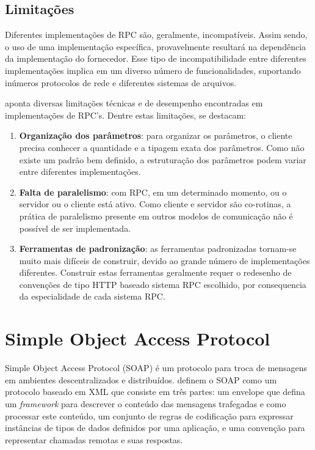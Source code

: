 \subsection{Limitações}

Diferentes implementações de RPC são, geralmente, incompatíveis. Assim sendo, o uso de uma implementação específica, provavelmente resultará na dependência da implementação do fornecedor. Esse tipo de incompatibilidade entre diferentes implementações implica em um diverso número de funcionalidades, suportando inúmeros protocolos de rede e diferentes sistemas de arquivos.

 aponta diversas limitações técnicas e de desempenho encontradas em implementações de RPC's. Dentre estas limitações, se destacam:

\begin{enumerate}[label=\alph*)]

\item \textbf{Organização dos parâmetros}: para organizar os parâmetros, o cliente precisa conhecer a quantidade e a tipagem exata dos parâmetros. Como não existe um padrão bem definido, a estruturação dos parâmetros podem variar entre diferentes implementações.

\item \textbf{Falta de paralelismo}: com RPC, em um determinado momento, ou o servidor ou o cliente está ativo. Como cliente e servidor são co-rotinas, a prática de paralelismo presente em outros modelos de comunicação não é possível de ser implementada.

\item \textbf{Ferramentas de padronização}: as ferramentas padronizadas tornam-se muito mais difíceis de construir, devido ao grande número de implementações diferentes. Construir estas ferramentas geralmente requer o redesenho de convenções de tipo HTTP baseado sistema RPC escolhido, por consequencia da especialidade de cada sistema RPC.

\end{enumerate}

\section{Simple Object Access Protocol}\label{sec:soap}

Simple Object Access Protocol (SOAP) é um protocolo para troca de mensagens em ambientes descentralizados e distribuídos.  definem o SOAP como 
um protocolo baseado em XML que consiste em três partes: um envelope que defina um \textit{framework} para descrever o conteúdo das mensagens trafegadas e como processar este conteúdo, um conjunto de regras de codificação para expressar instâncias de tipos de dados definidos por uma aplicação, e uma convenção para representar chamadas remotas e suas respostas.

